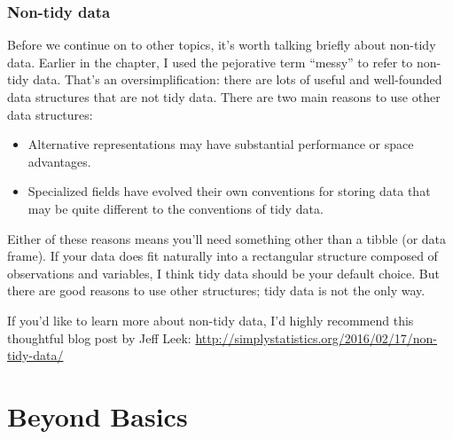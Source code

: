 \documentclass[]{book}
\newenvironment{Shaded}{\begin{snugshade}}{\end{snugshade}}
\newcommand{\KeywordTok}[1]{\textcolor[rgb]{0.13,0.29,0.53}{\textbf{#1}}}
\newcommand{\StringTok}[1]{\textcolor[rgb]{0.31,0.60,0.02}{#1}}
\newcommand{\CommentTok}[1]{\textcolor[rgb]{0.56,0.35,0.01}{\textit{#1}}}
\newcommand{\OperatorTok}[1]{\textcolor[rgb]{0.81,0.36,0.00}{\textbf{#1}}}
\newcommand{\NormalTok}[1]{#1}
\begin{document}
\begin{Shaded}
\end{Shaded}

\section{Non-tidy data}\label{non-tidy-data}

Before we continue on to other topics, it's worth talking briefly about
non-tidy data. Earlier in the chapter, I used the pejorative term
``messy'' to refer to non-tidy data. That's an oversimplification: there
are lots of useful and well-founded data structures that are not tidy
data. There are two main reasons to use other data structures:

\begin{itemize}
\item
  Alternative representations may have substantial performance or space
  advantages.
\item
  Specialized fields have evolved their own conventions for storing data
  that may be quite different to the conventions of tidy data.
\end{itemize}

Either of these reasons means you'll need something other than a tibble
(or data frame). If your data does fit naturally into a rectangular
structure composed of observations and variables, I think tidy data
should be your default choice. But there are good reasons to use other
structures; tidy data is not the only way.

If you'd like to learn more about non-tidy data, I'd highly recommend
this thoughtful blog post by Jeff Leek:
\url{http://simplystatistics.org/2016/02/17/non-tidy-data/}

\part{Beyond Basics}\label{part-beyond-basics}
\end{document}
